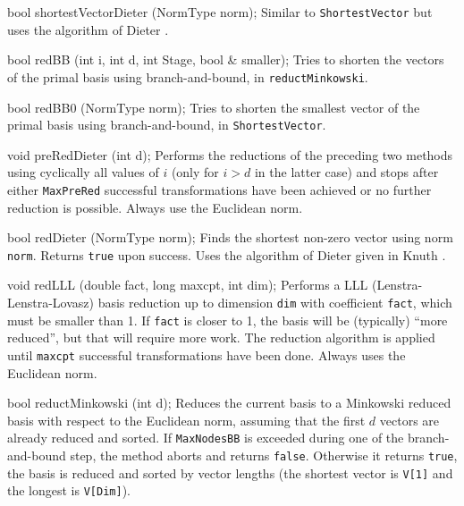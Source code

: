 {{   bool shortestVectorDieter (NormType norm);
\endcode
\tabb
Similar to \texttt{ShortestVector} but uses the algorithm of
  Dieter \cite{rDIE75a,rKNU98a}.
\endtabb
\code

   bool redBB (int i, int d, int Stage, bool & smaller);
\endcode
\tabb
  Tries to shorten the vectors of the primal basis using branch-and-bound,
  in \texttt{reductMinkowski}.
\endtabb
\code

   bool redBB0 (NormType norm);
\endcode
\tabb  Tries to shorten the smallest vector of the primal basis 
  using branch-and-bound, in \texttt{ShortestVector}.
\endtabb
\code

   void preRedDieter (int d);
\endcode
\tabb
Performs the reductions of the preceding two methods
  using cyclically all values of $i$ (only for $i > d$ in the latter case)
  and stops after either \texttt{MaxPreRed} successful transformations have been
  achieved or no further reduction is possible.
  Always use the Euclidean norm.
\endtabb
\code

   bool redDieter (NormType norm);
\endcode
\tabb
Finds the shortest non-zero vector using norm \texttt{norm}.
 Returns \texttt{true} upon success. %
 Uses the algorithm of Dieter \cite{rDIE75a} given in Knuth \cite{rKNU98a}.
\endtabb
\code

   void redLLL (double fact, long maxcpt, int dim);
\endcode
\tabb
Performs a LLL (Lenstra-Lenstra-Lovasz) basis reduction up to dimension
   \texttt{dim} with coefficient \texttt{fact}, which must be smaller than 1.
   If \texttt{fact} is closer to 1, the basis will be
   (typically) ``more reduced'', but that will require more work.
   The reduction algorithm is applied until \texttt{maxcpt} successful
   transformations have been done. Always uses the Euclidean norm.
\endtabb
\code

   bool reductMinkowski (int d);
\endcode
\tabb
Reduces the current basis to a Minkowski reduced basis
    with respect to the Euclidean norm, assuming
   that the first $d$ vectors are already reduced and sorted.
   If \texttt{MaxNodesBB} is exceeded during {one} of the branch-and-bound step,
   the method aborts and returns \texttt{false}.
   Otherwise it returns \texttt{true}, the basis is reduced and
    sorted by vector lengths (the shortest vector is \texttt{V[1]} and
   the longest is \texttt{V[Dim]}).
\endtabb
\code

}}
